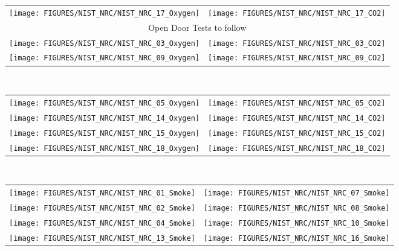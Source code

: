\clearpage

\begin{figure}[p]
\begin{tabular*}{\textwidth}{l@{\extracolsep{\fill}}r}
\texttt{[image: FIGURES/NIST\_NRC/NIST\_NRC\_17\_Oxygen]} &
\texttt{[image: FIGURES/NIST\_NRC/NIST\_NRC\_17\_CO2]} \\
\multicolumn{2}{c}{Open Door Tests to follow} \\
\texttt{[image: FIGURES/NIST\_NRC/NIST\_NRC\_03\_Oxygen]} &
\texttt{[image: FIGURES/NIST\_NRC/NIST\_NRC\_03\_CO2]} \\
\texttt{[image: FIGURES/NIST\_NRC/NIST\_NRC\_09\_Oxygen]} &
\texttt{[image: FIGURES/NIST\_NRC/NIST\_NRC\_09\_CO2]}
\end{tabular*}\
\end{figure}

\begin{figure}[p]
\begin{tabular*}{\textwidth}{l@{\extracolsep{\fill}}r}
\texttt{[image: FIGURES/NIST\_NRC/NIST\_NRC\_05\_Oxygen]} &
\texttt{[image: FIGURES/NIST\_NRC/NIST\_NRC\_05\_CO2]} \\
\texttt{[image: FIGURES/NIST\_NRC/NIST\_NRC\_14\_Oxygen]} &
\texttt{[image: FIGURES/NIST\_NRC/NIST\_NRC\_14\_CO2]} \\
\texttt{[image: FIGURES/NIST\_NRC/NIST\_NRC\_15\_Oxygen]} &
\texttt{[image: FIGURES/NIST\_NRC/NIST\_NRC\_15\_CO2]} \\
\texttt{[image: FIGURES/NIST\_NRC/NIST\_NRC\_18\_Oxygen]} &
\texttt{[image: FIGURES/NIST\_NRC/NIST\_NRC\_18\_CO2]}
\end{tabular*}\
\end{figure}

\clearpage

\begin{figure}[p]
\begin{tabular*}{\textwidth}{l@{\extracolsep{\fill}}r}
\texttt{[image: FIGURES/NIST\_NRC/NIST\_NRC\_01\_Smoke]} &
\texttt{[image: FIGURES/NIST\_NRC/NIST\_NRC\_07\_Smoke]} \\
\texttt{[image: FIGURES/NIST\_NRC/NIST\_NRC\_02\_Smoke]} &
\texttt{[image: FIGURES/NIST\_NRC/NIST\_NRC\_08\_Smoke]} \\
\texttt{[image: FIGURES/NIST\_NRC/NIST\_NRC\_04\_Smoke]} &
\texttt{[image: FIGURES/NIST\_NRC/NIST\_NRC\_10\_Smoke]} \\
\texttt{[image: FIGURES/NIST\_NRC/NIST\_NRC\_13\_Smoke]} &
\texttt{[image: FIGURES/NIST\_NRC/NIST\_NRC\_16\_Smoke]}
\end{tabular*}\
\label{NIST_NRC_Smoke_Closed}
\end{figure}

